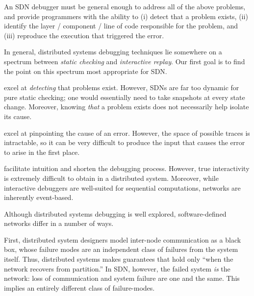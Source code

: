 An SDN debugger must be general enough to address all of the above problems, and provide programmers
with the ability to (i) detect that a problem exists, (ii) identify the layer / component / line of code
responsible for the problem, and (iii) reproduce the execution that triggered the error.

In general, distributed systems debugging techniques lie somewhere on a spectrum between
{\it static checking} and {\it interactive replay}. Our first goal is to find
the point on this spectrum most appropriate for SDN. 

 \cite{anteater} excel at {\it detecting} that problems
     exist. However, SDNs are far too dynamic for pure static checking; one would
     essentially need to take snapshots at every state change. Moreover,
     knowing {\it that} a problem exists does not necessarily help isolate its
     cause.

 \cite{x-trace} excel at pinpointing the cause of an
error. However, the space of possible traces is intractable, so it can be very
difficult to produce the input that causes the error to arise in the first
place.

 facilitate intuition and shorten the
      debugging process. However, true interactivity is extremely difficult to
      obtain in a distributed system. 
      Moreover, while interactive debuggers are
      well-suited for sequential
      computations, networks are inherently event-based.

Although distributed systems debugging is well explored,
 software-defined networks differ in a number of ways.

         
	First, distributed system designers model inter-node communication as a black box, whose failure modes are an independent class of failures from the system itself.
	Thus, distributed systems makes guarantees that hold only ``when the network recovers from partition.''
	In SDN, however, the failed system {\it is} the network: loss of
    communication and system failure are one and the same. This implies an
    entirely different class of failure-modes.

